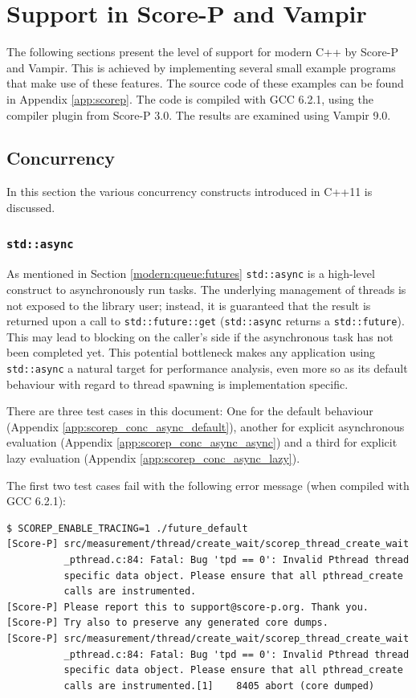 \section{Support in Score-P and Vampir}

The following sections present the level of support for modern C++ by Score-P and Vampir. This is achieved by implementing several small example programs that make use of these features. The source code of these examples can be found in Appendix \ref{app:scorep}. The code is compiled with GCC 6.2.1, using the compiler plugin from Score-P 3.0. The results are examined using Vampir 9.0.

\subsection{Concurrency}\label{scorep:conc}

In this section the various concurrency constructs introduced in C++11 is discussed.

\subsubsection{\texttt{std::async}}\label{scorep:conc:async}

As mentioned in Section \ref{modern:queue:futures} \texttt{std::async} is a high-level construct to asynchronously run tasks. The underlying management of threads is not exposed to the library user; instead, it is guaranteed that the result is returned upon a call to \texttt{std::future::get} (\texttt{std::async} returns a \texttt{std::future}). This may lead to blocking on the caller's side if the asynchronous task has not been completed yet. This potential bottleneck makes any application using \texttt{std::async} a natural target for performance analysis, even more so as its default behaviour with regard to thread spawning is implementation specific.

There are three test cases in this document: One for the default behaviour (Appendix \ref{app:scorep_conc_async_default}), another for explicit asynchronous evaluation (Appendix \ref{app:scorep_conc_async_async}) and a third for explicit lazy evaluation (Appendix \ref{app:scorep_conc_async_lazy}).

The first two test cases fail with the following error message (when compiled with GCC 6.2.1):

\begin{verbatim}
$ SCOREP_ENABLE_TRACING=1 ./future_default                                      
[Score-P] src/measurement/thread/create_wait/scorep_thread_create_wait
          _pthread.c:84: Fatal: Bug 'tpd == 0': Invalid Pthread thread
          specific data object. Please ensure that all pthread_create
          calls are instrumented.
[Score-P] Please report this to support@score-p.org. Thank you.
[Score-P] Try also to preserve any generated core dumps.
[Score-P] src/measurement/thread/create_wait/scorep_thread_create_wait
          _pthread.c:84: Fatal: Bug 'tpd == 0': Invalid Pthread thread
          specific data object. Please ensure that all pthread_create
          calls are instrumented.[1]    8405 abort (core dumped)
\end{verbatim}

